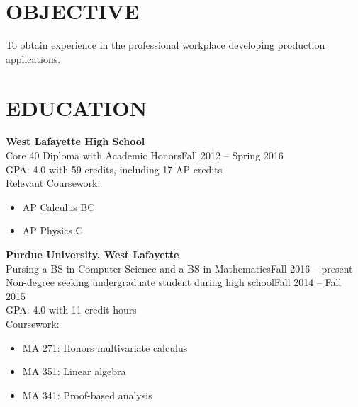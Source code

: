 \documentclass[line,margin]{res}
\begin{document}
\begin{resume}

  \section{OBJECTIVE}
  To obtain experience in the professional workplace developing production applications.


  \section{EDUCATION}
  {\bf\rmfamily West Lafayette High School}\\
  Core 40 Diploma with Academic Honors\hfill Fall 2012 -- Spring 2016\\
  GPA: 4.0 with 59 credits, including 17 AP credits\\
  Relevant Coursework:
  \multicolsep 0pt
  \begin{multicols}{2}
  \begin{itemize} \itemsep -2pt\RaggedRight
  \item AP Calculus BC
    \columnbreak
  \item AP Physics C
  \end{itemize}
  \end{multicols}

  {\bf\rmfamily Purdue University, West Lafayette}\\
  Pursing a BS in Computer Science and a BS in Mathematics\hfill Fall 2016 -- present\\
  Non-degree seeking undergraduate student during high school\hfill Fall 2014 -- Fall 2015\\
  GPA: 4.0 with 11 credit-hours \\
  Coursework:
  \multicolsep 0pt
  \begin{multicols}{2}
  \begin{itemize} \itemsep -2pt
  \item MA 271: Honors multivariate calculus
  \item MA 351: Linear algebra
  \item MA 341: Proof-based analysis
  \end{itemize}
  \end{multicols}




\end{resume}
\end{document}
